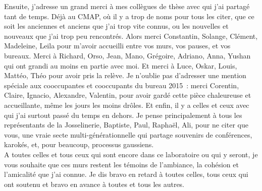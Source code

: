 \documentclass[a4paper]{book}
\begin{document}










Ensuite, j'adresse un
grand merci à mes collègues de thèse avec qui j'ai partagé tant de temps. %
Déjà au CMAP, 
où il y a trop de noms pour tous les citer, que ce soit les anciennes et anciens que j'ai trop vite connus, %
ou les nouvelles et nouveaux que j'ai trop peu rencontrés. 
Alors merci Constantin, Solange, Clément, Madeleine, Leila pour m'avoir accueilli entre vos murs, vos pauses, et vos bureaux. Merci à Richard, Orso, Jean, Mano, Grégoire, Adriano, Anna, Yushan qui ont grandi au moins en partie avec moi.
Et merci à Luce, Oskar, Louis, Mattéo, Théo pour avoir pris la relève.
Je n'oublie pas d'adresser une mention spéciale aux cooccupantes et cooccupants du bureau 2015~: merci Corentin, Claire, Ignacio, Alexandre, Valentin,  pour avoir gardé cette pièce chaleureuse et accueillante, même les jours les moins drôles.
Et enfin, il y a celles et ceux avec qui j'ai surtout passé du temps en dehors. Je pense principalement à tous les représentants de la Josselinerie, Baptiste, Paul, Raphaël, Ali, pour ne citer que vous, une vraie secte multi-générationnelle qui partage souvenirs de conférences, karokés, et, pour beaucoup, processus gaussiens.\\
A toutes celles et tous ceux qui sont encore dans ce laboratoire ou qui y seront, je vous souhaite que ces murs restent les témoins de l'ambiance, la cohésion et l'amicalité que j'ai connue. %
Je dis bravo en retard à toutes celles, tous ceux qui ont soutenu et bravo en avance à toutes et tous les autres.
\end{document}
